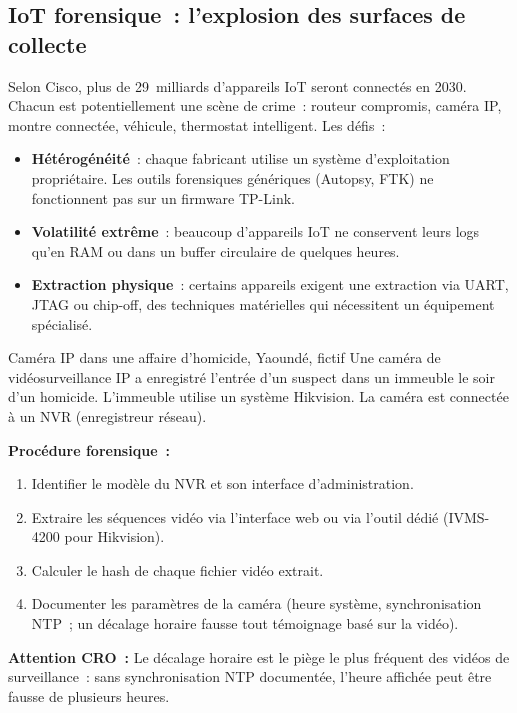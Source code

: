 \subsection{IoT forensique~: l'explosion des surfaces de collecte}

Selon Cisco, plus de 29~milliards d'appareils IoT seront connectés en 2030.
Chacun est potentiellement une scène de crime~: routeur compromis, caméra IP,
montre connectée, véhicule, thermostat intelligent. Les défis~:

\begin{itemize}
    \item \textbf{Hétérogénéité}~: chaque fabricant utilise un système
          d'exploitation propriétaire. Les outils forensiques génériques
          (Autopsy, FTK) ne fonctionnent pas sur un firmware TP-Link.
    \item \textbf{Volatilité extrême}~: beaucoup d'appareils IoT ne
          conservent leurs logs qu'en RAM ou dans un buffer circulaire
          de quelques heures.
    \item \textbf{Extraction physique}~: certains appareils exigent
          une extraction via UART, JTAG ou chip-off, des techniques
          matérielles qui nécessitent un équipement spécialisé.
\end{itemize}

\begin{boxscenario}{Caméra IP dans une affaire d'homicide, Yaoundé, fictif}
Une caméra de vidéosurveillance IP a enregistré l'entrée d'un suspect dans
un immeuble le soir d'un homicide. L'immeuble utilise un système Hikvision.
La caméra est connectée à un NVR (enregistreur réseau).

\textbf{Procédure forensique~:}
\begin{enumerate}
    \item Identifier le modèle du NVR et son interface d'administration.
    \item Extraire les séquences vidéo via l'interface web ou via
          l'outil dédié (IVMS-4200 pour Hikvision).
    \item Calculer le hash de chaque fichier vidéo extrait.
    \item Documenter les paramètres de la caméra (heure système,
          synchronisation NTP~; un décalage horaire fausse tout
          témoignage basé sur la vidéo).
\end{enumerate}

\textbf{Attention CRO~:} 
Le décalage horaire est le piège le plus fréquent des vidéos de
surveillance~: sans synchronisation NTP documentée, l'heure affichée
peut être fausse de plusieurs heures.
\end{boxscenario}

